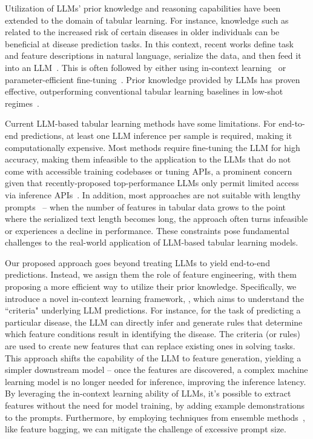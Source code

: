 \documentclass{article}
\theoremstyle{plain}
\theoremstyle{definition}
\theoremstyle{remark}
\begin{document}
Utilization of LLMs' prior knowledge and reasoning capabilities have been extended to the domain of tabular learning. For instance, knowledge such as related to the increased risk of certain diseases in older individuals can be beneficial at disease prediction tasks. In this context, recent works define task and feature descriptions in natural language, serialize the data, and then feed it into an LLM~\cite{dinh2022lift,wang2023anypredict}. This is often followed by either using in-context learning~\cite{nam2023semi} or parameter-efficient fine-tuning~\cite{dinh2022lift,hegselmann2023tabllm}. Prior knowledge provided by LLMs has proven effective, outperforming conventional tabular learning baselines in low-shot regimes~\cite{hegselmann2023tabllm}. 

Current LLM-based tabular learning methods have some limitations. For end-to-end predictions, at least one LLM inference per sample is required, making it computationally expensive. Most methods require fine-tuning the LLM for high accuracy, making them infeasible to the application to the LLMs that do not come with accessible training codebases or tuning APIs, a prominent concern given that recently-proposed top-performance LLMs only permit limited access via inference APIs~\cite{anil2023palm,openai2023gpt4}. In addition, most approaches are not suitable with lengthy prompts~\cite{liu2023lost} -- when the number of features in tabular data grows to the point where the serialized text length becomes long, the approach often turns infeasible or experiences a decline in performance. These constraints pose fundamental challenges to the real-world application of LLM-based tabular learning models. 

Our proposed approach goes beyond treating LLMs to yield end-to-end predictions. Instead, we assign them the role of feature engineering, with them proposing a more efficient way to utilize their prior knowledge. Specifically, we introduce a novel in-context learning framework, \model{}, which aims to understand the ``criteria" underlying LLM predictions. For instance, for the task of predicting a particular disease, the LLM can directly infer and generate rules that determine which feature conditions result in identifying the disease. The criteria (or rules) are used to create new features that can replace existing ones in solving tasks. This approach shifts the capability of the LLM to feature generation, yielding a simpler downstream model -- once the features are discovered, a complex machine learning model is no longer needed for inference, improving the inference latency.
By leveraging the in-context learning ability of LLMs, it's possible to extract features without the need for model training, by adding example demonstrations to the prompts. Furthermore, by employing techniques from ensemble methods~\cite{breiman2001random}, like feature bagging, we can mitigate the challenge of excessive prompt size. 
\end{document}
